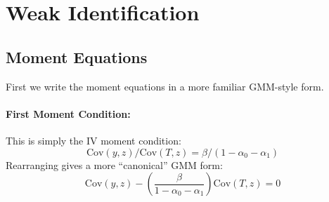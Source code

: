 \documentclass[12pt]{article}
\begin{document}
\section{Weak Identification}

\subsection{Moment Equations}
First we write the moment equations in a more familiar GMM-style form.
\paragraph{First Moment Condition:}
This is simply the IV moment condition: 
\[
  \mbox{Cov}(y,z)/ \mbox{Cov}(T,z) = \beta/(1 - \alpha_0 - \alpha_1)
\]
Rearranging gives a more ``canonical'' GMM form:
\[
  \mbox{Cov}(y,z) - \left( \frac{\beta}{1 - \alpha_0 - \alpha_1} \right) \mbox{Cov}(T,z) = 0
\]
\end{document}
